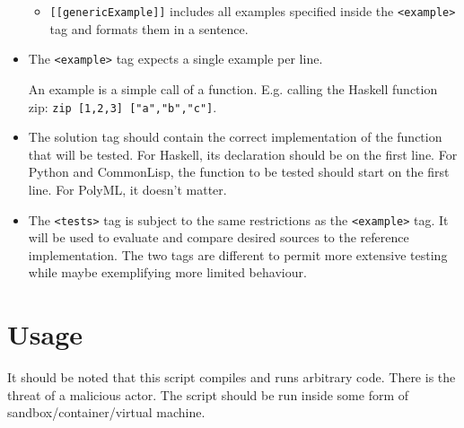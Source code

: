 \documentclass[a4paper,12pt]{article}
\begin{document}
\begin{itemize}
\begin{itemize}
  \item \texttt{[[genericExample]]} includes all examples specified inside the \texttt{<example>} tag and formats them in a sentence.
    
 \end{itemize}
 
 \item The \texttt{<example>} tag expects a single example per line.
 
 An example is a simple call of a function. E.g. calling the Haskell function zip: \texttt{zip [1,2,3] ["a","b","c"]}.
 
 \item The solution tag should contain the correct implementation of the function that will be tested. For Haskell, its declaration should be on the first line. For Python and CommonLisp, the function to be tested should start on the first line. For PolyML, it doesn't matter.

 \item The \texttt{<tests>} tag is subject to the same restrictions as the \texttt{<example>} tag. It will be used to evaluate and compare desired sources to the reference implementation. The two tags are different to permit more extensive testing while maybe exemplifying more limited behaviour.
 
\end{itemize}

\section{Usage}

It should be noted that this script compiles and runs arbitrary code. There is the threat of a malicious actor. The script should be run inside some form of sandbox/container/virtual machine.
\end{document}
